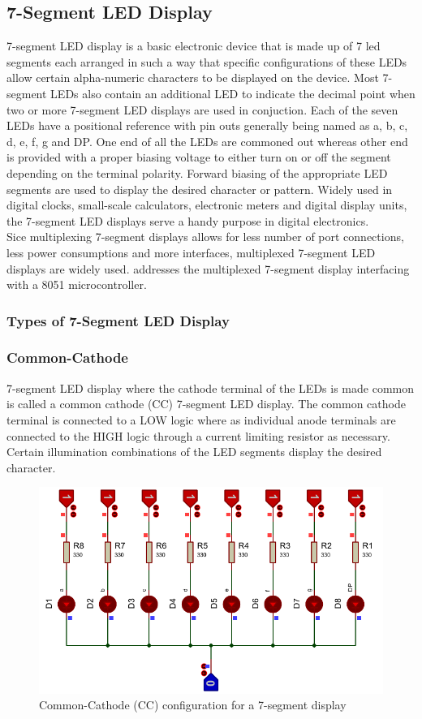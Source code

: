 \documentclass{lab_sheet}
\begin{document}
    \subsection{7-Segment LED Display}
    7-segment LED display is a basic electronic device that is made up of 7 led segments each arranged in such a way that specific configurations of these LEDs allow certain alpha-numeric characters to be displayed on the device. Most 7-segment LEDs also contain an additional LED to indicate the decimal point when two or more 7-segment LED displays are used in conjuction. Each of the seven LEDs have a positional reference with pin outs generally being named as a, b, c, d, e, f, g and DP. One end of all the LEDs are commoned out whereas other end is provided with a proper biasing voltage to either turn on or off the segment depending on the terminal polarity. Forward biasing of the appropriate LED segments are used to display the desired character or pattern. Widely used in digital clocks, small-scale calculators, electronic meters and digital display units, the 7-segment LED displays serve a handy purpose in digital electronics.\\
    Sice multiplexing 7-segment displays allows for less number of port connections, less power consumptions and more interfaces, multiplexed 7-segment LED displays are widely used. \cite{rathod2020a} addresses the multiplexed 7-segment display interfacing with a 8051 microcontroller.
    \subsubsection{Types of 7-Segment LED Display}
    \subsubsection*{Common-Cathode}
    7-segment LED display where the cathode terminal of the LEDs is made common is called a common cathode (CC) 7-segment LED display. The common cathode terminal is connected to a LOW logic where as individual anode terminals are connected to the HIGH logic through a current limiting resistor as necessary. Certain illumination combinations of the LED segments display the desired character.
    \begin{figure}[H]
        \centering
        \includegraphics[scale=1]{../Figures/led1}
        \caption{Common-Cathode (CC) configuration for a 7-segment display}
        \label{fig:cc}
        \end{figure}
\end{document}
